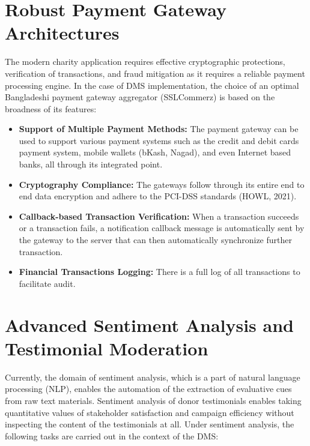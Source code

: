 \documentclass{thesis-library}
\begin{document}
\section{Robust Payment Gateway Architectures}

The modern charity application requires effective cryptographic protections, verification of transactions, and fraud mitigation as it requires a reliable payment processing engine. In the case of DMS implementation, the choice of an optimal Bangladeshi payment gateway aggregator (SSLCommerz)\cite{hossain2019e} is based on the broadness of its features:

\begin{itemize}
    \item \textbf{Support of Multiple Payment Methods:} The payment gateway can be used to support various payment systems such as the credit and debit cards payment system, mobile wallets (bKash, Nagad), and even Internet based banks, all through its integrated point.
    \item \textbf{Cryptography Compliance:} The gateways follow through its entire end to end data encryption and adhere to the PCI-DSS standards (HOWL, 2021).
    \item \textbf{Callback-based Transaction Verification:} When a transaction succeeds or a transaction fails, a notification callback message is automatically sent by the gateway to the server that can then automatically synchronize further transaction.
    \item \textbf{Financial Transactions Logging:} There is a full log of all transactions to facilitate audit.
\end{itemize}

\section{Advanced Sentiment Analysis and Testimonial Moderation}

Currently, the domain of sentiment analysis, which is a part of natural language processing (NLP), enables the automation of the extraction of evaluative cues from raw text materials. Sentiment analysis of donor testimonials enables taking quantitative values of stakeholder satisfaction and campaign efficiency without inspecting the content of the testimonials at all. Under sentiment analysis, the following tasks are carried out in the context of the DMS:
\end{document}
